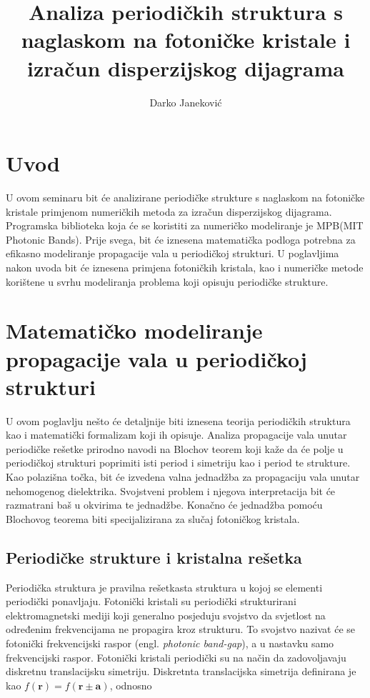 \documentclass[utf8, seminar, numeric]{fer}
\begin{document}
\title{Analiza periodičkih struktura s naglaskom na fotoničke kristale
	   i izračun disperzijskog dijagrama}
\author{Darko Janeković}

\maketitle

\tableofcontents


\chapter{Uvod}
U ovom seminaru bit će analizirane periodičke strukture s naglaskom na fotoničke
kristale primjenom numeričkih metoda za izračun disperzijskog dijagrama.
Programska biblioteka koja će se koristiti za numeričko modeliranje je
MPB(MIT Photonic Bands)\cite{Johnson2001:mpb}. Prije svega, bit će iznesena
matematička podloga potrebna za efikasno modeliranje propagacije vala u
periodičkoj strukturi. U poglavljima nakon uvoda bit će iznesena primjena
fotoničkih kristala, kao i numeričke metode korištene u svrhu modeliranja
problema koji opisuju periodičke strukture.


\chapter{Matematičko modeliranje propagacije vala u periodičkoj strukturi}

U ovom poglavlju nešto će detaljnije biti iznesena teorija periodičkih struktura
kao i matematički formalizam koji ih opisuje. Analiza propagacije vala unutar
periodičke rešetke prirodno navodi na Blochov teorem koji kaže da će polje u
periodičkoj strukturi poprimiti isti period i simetriju kao i period te strukture.
Kao polazišna točka, bit će izvedena valna jednadžba za propagaciju vala unutar
nehomogenog dielektrika. Svojstveni problem i njegova interpretacija bit će
razmatrani baš u okvirima te jednadžbe. Konačno će jednadžba pomoću Blochovog
teorema biti specijalizirana za slučaj fotoničkog kristala.


\section{Periodičke strukture i kristalna rešetka}

Periodička struktura je pravilna rešetkasta struktura u kojoj se elementi
periodički ponavljaju. Fotonički kristali su periodički strukturirani
elektromagnetski mediji koji generalno posjeduju svojstvo da svjetlost na
određenim frekvencijama ne propagira kroz strukturu. To svojstvo nazivat će se
fotonički frekvencijski raspor (engl. \textit{photonic band-gap}), a u nastavku
samo frekvencijski raspor. Fotonički kristali periodički su na način da
zadovoljavaju diskretnu translacijsku simetriju. Diskretnta translacijska
simetrija definirana je kao
${f(\mathbf{r}) = f(\mathbf{r} \pm \mathbf{a})}$, odnosno
\end{document}
